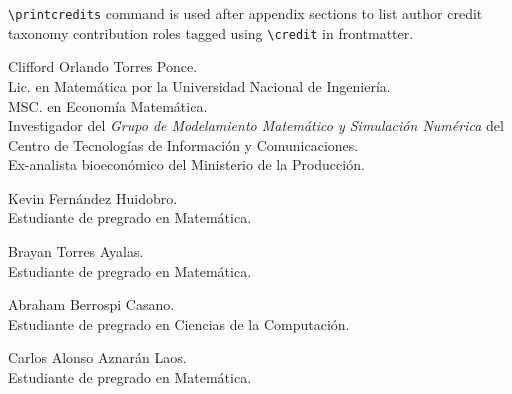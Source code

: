 \documentclass[a4paper,fleqn]{cas-dc}
\begin{document}
\verb+\printcredits+ command is used after appendix sections to list 
author credit taxonomy contribution roles tagged using \verb+\credit+ 
in frontmatter.

\printcredits

%



\nocite{*}


Clifford Orlando Torres Ponce.\\
Lic. en Matemática por la Universidad Nacional de Ingeniería.\\
MSC. en Economía Matemática.\\
Investigador del \emph{Grupo de Modelamiento Matemático y Simulación Numérica} del Centro de Tecnologías de Información y Comunicaciones.\\
Ex-analista bioeconómico del Ministerio de la Producción.
\endbio

\bio{}
Kevin Fernández Huidobro.\\
Estudiante de pregrado en Matemática.
\endbio

\bio{}
Brayan Torres Ayalas.\\
Estudiante de pregrado en Matemática.
\endbio

\bio{}
Abraham Berrospi Casano.\\
Estudiante de pregrado en Ciencias de la Computación.
\endbio


Carlos Alonso Aznarán Laos.\\
Estudiante de pregrado en Matemática.
\endbio
\end{document}
